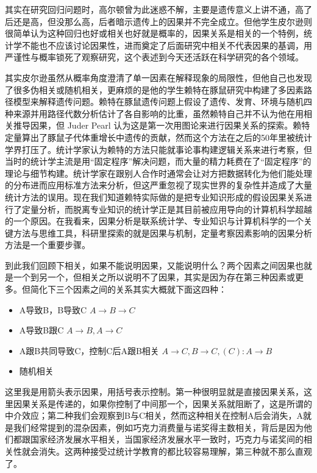 \documentclass[]{tufte-book}
\providecommand{\tightlist}{%
  \setlength{\itemsep}{0pt}\setlength{\parskip}{0pt}}
\begin{document}
其实在研究回归问题时，高尔顿曾为此迷惑不解，主要是遗传意义上讲不通，高了后还是高，但没那么高，后者暗示遗传上的因果并不完全成立。但他学生皮尔逊则很简单认为这种回归也好或相关也好就是概率的，因果关系是相关的一个特例，统计学不能也不应该讨论因果性，进而奠定了后面研究中相关不代表因果的基调，用严谨性与概率锁死了观察研究，这个表述到今天还活跃在科学研究的各个领域。

其实皮尔逊虽然从概率角度澄清了单一因素在解释现象的局限性，但他自己也发现了很多伪相关或随机相关，更麻烦的是他的学生赖特在豚鼠研究中构建了多因素路径模型来解释遗传问题。赖特在豚鼠遗传问题上假设了遗传、发育、环境与随机四种来源并用路径代数分析估计了各自影响的比重，虽然赖特自己并不认为他在用相关推导因果，但 Juder Pearl 认为这是第一次用图论来进行因果关系的探索。赖特定量算出了豚鼠子代体重增长中遗传的贡献，然而这个方法在之后的50年里被统计学界打压了。统计学家认为赖特的方法只能就事论事构建逻辑关系来进行考察，但当时的统计学主流是用``固定程序''解决问题，而大量的精力耗费在了``固定程序''的理论与细节构建。统计学家在跟别人合作时通常会让对方把数据转化为他们能处理的分布进而应用标准方法来分析，但这严重忽视了现实世界的复杂性并造成了大量统计方法的误用。现在我们知道赖特实际做的是把专业知识形成的假设因果关系进行了定量分析，而脱离专业知识的统计学正是其目前被应用导向的计算机科学超越的一个原因。在我看来，因果分析是联系统计学、专业知识与计算机科学的一个关键方法与思维工具，科研里探索的就是因果与机制，定量考察因素影响的因果分析方法是一个重要步骤。

到此我们回顾下相关，如果不能说明因果，又能说明什么？两个因素之间因果也就是一个到另一个，但相关之所以说明不了因果，其实是因为存在第三种因素或更多。但简化下三个因素之间的关系其实大概就下面这四种：

\begin{itemize}
\tightlist
\item
  A导致B，B导致C \(A\rightarrow B\rightarrow C\)
\item
  A导致B跟C \(A\rightarrow B, A\rightarrow C\)
\item
  A跟B共同导致C，控制C后A跟B相关 \(A\rightarrow C, B\rightarrow C, (C): A \rightarrow B\)
\item
  随机相关
\end{itemize}

这里我是用箭头表示因果，用括号表示控制。第一种很明显就是直接因果关系，这里因果关系是传递的，如果你控制了中间那一个，因果关系就阻断了，这是所谓的中介效应；第二种我们会观察到B与C相关，然而这种相关在控制A后会消失，A就是我们经常提到的混杂因素，例如巧克力消费量与诺奖得主数相关，背后是因为他们都跟国家经济发展水平相关，当国家经济发展水平一致时，巧克力与诺奖间的相关性就会消失。这两种接受过统计学教育的都比较容易理解，第三种就不那么直观了。
\end{document}
